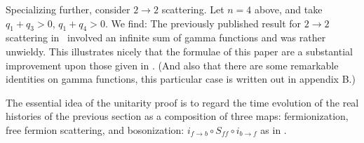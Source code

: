 Specializing further,
consider $2\to 2$ scattering. Let $n=4$ above, and take
$q_1+q_3>0$, $q_1+q_4>0$. We find:
\eqn{}
The previously published result for $2\to 2$
scattering in \moore\
involved 
an infinite sum of gamma functions
and was rather unwieldy. This illustrates nicely that the formulae
of this paper are a substantial improvement upon those given in
\moore. (And also that there are some remarkable identities on
gamma functions, this particular case is written out in appendix
B.)
 
 
 
 
 
The essential idea of the unitarity proof is to regard the
time evolution of the real histories of the previous section
as a composition of three maps: fermionization, free fermion
scattering, and bosonization: $i_{f\to b}\circ S_{ff}\circ i_{b\to f}$
as in
\fig{}.
 
